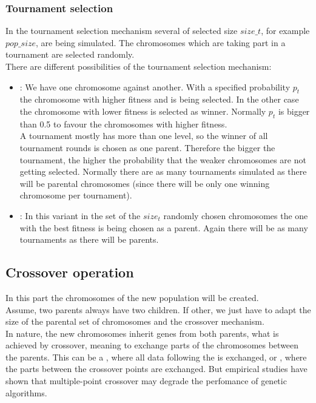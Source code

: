 \subsubsection{Tournament selection}
In the tournament selection mechanism several  of selected size $size\_t$, for example $pop\_size$, are being simulated. The chromosomes which are taking part in a tournament are selected randomly.\\
There are different possibilities of the tournament selection mechanism:
\begin{itemize}
\item {}: We have one chromosome against another. With a specified probability $p_t$ the chromosome with higher fitness  and is being selected. In the other case the chromosome with lower fitness is selected as winner. Normally $p_t$ is bigger than 0.5 to favour the chromosomes with higher fitness.\\
A tournament mostly has more than one level, so the winner of all tournament rounds is chosen as one parent. Therefore the bigger the tournament, the higher the probability that the weaker chromosomes are not getting selected. Normally there are as many tournaments simulated as there will be parental chromosomes (since there will be only one winning chromosome per tournament).
\item {}: In this variant in the set of the $size_t$ randomly chosen chromosomes the one with the best fitness is being chosen as a parent. Again there will be as many tournaments as there will be parents.
\end{itemize}


\subsection{Crossover operation}
In this part the chromosomes of the new population will be created.\\
Assume, two parents always have two children. If other, we just have to adapt the size of the parental set of chromosomes and the crossover mechanism.\\
In nature, the new chromosomes inherit genes from both parents, what is achieved by crossover, meaning to exchange parts of the chromosomes between the parents. This can be a , where all data following the  is exchanged, or , where the parts between the crossover points are exchanged. But empirical studies have shown that multiple-point crossover may degrade the perfomance of genetic algorithms.

